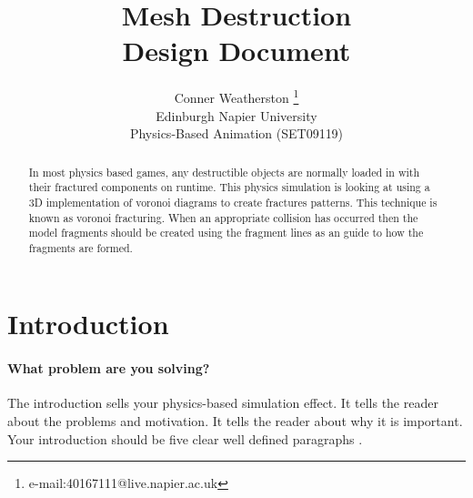 \documentclass[conference,backref=page]{acmsiggraph}
\title{Mesh Destruction\\
	   Design Document}
\author{Conner Weatherston \thanks{e-mail:40167111@live.napier.ac.uk} \\
Edinburgh Napier University\\
Physics-Based Animation (SET09119)}
\begin{document}

\maketitle

\raggedbottom

\begin{abstract}

In most physics based games, any destructible objects are normally loaded in with their fractured components on runtime. This physics simulation is looking at using a 3D implementation of voronoi diagrams to create fractures patterns. This technique is known as voronoi fracturing. When an appropriate collision has occurred then the model fragments should be created using the fragment lines as an guide to how the fragments are formed.

\end{abstract}



\keywordlist


\section{Introduction}


\paragraph{What problem are you solving?}
The introduction sells your physics-based simulation effect.  It tells the reader about the problems and motivation.  It tells the reader about why it is important.  Your introduction should be five clear well defined paragraphs \cite{day2012write}.
\end{document}
